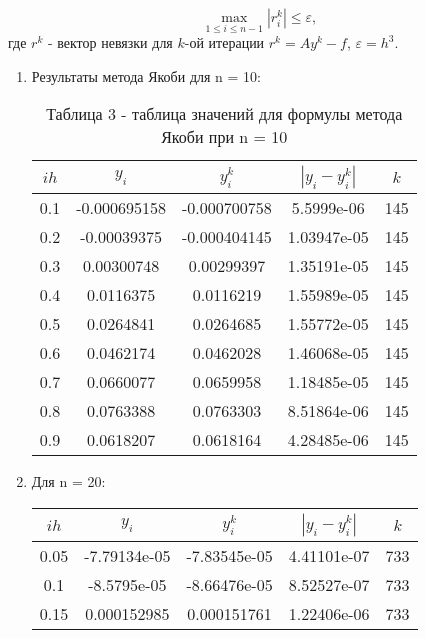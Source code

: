 \documentclass[a4paper,12pt]{article}
\begin{document}
\begin{equation*}
  \max_{1 \le i \le n - 1} \left|r_{i}^{k}\right| \le \varepsilon,
\end{equation*}
где $r^k$ - вектор невязки для $k$-ой итерации $r^k = Ay^k - f$, \hspace{0.5cm} $\varepsilon = h^3$.
\newpage
\begin{enumerate}[label = \arabic*.]
  \item {Результаты метода Якоби для n = 10:
    \begin{table}[h]
      \centering
      \begin{tabular}{|c|c|c|c|c|}
        \hline
        $ih$ & $y_i$ & $y^k_i$ & $\left|y_i-y^k_i\right|$ & $k$\\ \hline
        0.1 & -0.000695158 & -0.000700758 &   5.5999e-06 & 145\\ \hline
        0.2 &  -0.00039375 & -0.000404145 &  1.03947e-05 & 145\\ \hline
        0.3 &   0.00300748 &   0.00299397 &  1.35191e-05 & 145\\ \hline
        0.4 &    0.0116375 &    0.0116219 &  1.55989e-05 & 145\\ \hline
        0.5 &    0.0264841 &    0.0264685 &  1.55772e-05 & 145\\ \hline
        0.6 &    0.0462174 &    0.0462028 &  1.46068e-05 & 145\\ \hline
        0.7 &    0.0660077 &    0.0659958 &  1.18485e-05 & 145\\ \hline
        0.8 &    0.0763388 &    0.0763303 &  8.51864e-06 & 145\\ \hline
        0.9 &    0.0618207 &    0.0618164 &  4.28485e-06 & 145\\ \hline
      \end{tabular}
      \caption*{\small{Таблица 3 - таблица значений для формулы метода Якоби при n = 10}}
    \end{table}
  }
  \item {Для n = 20:
    \begin{table}[h]
      \centering
      \begin{tabular}{|c|c|c|c|c|}
        \hline
        $ih$ & $y_i$ & $y^k_i$ & $\left|y_i-y^k_i\right|$ & $k$\\ \hline
        0.05 & -7.79134e-05 & -7.83545e-05 &  4.41101e-07 & 733\\ \hline
        0.1 &  -8.5795e-05 & -8.66476e-05 &  8.52527e-07 & 733\\ \hline
        0.15 &  0.000152985 &  0.000151761 &  1.22406e-06 & 733\\ \hline

\end{tabular}
\end{table}}
\end{enumerate}
\end{document}
